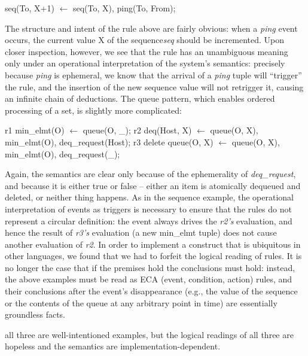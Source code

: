 \begin{Dedalus}
seq(To, X+1) \(\leftarrow\) 
  seq(To, X), ping(To, From);
\end{Dedalus}

The structure and intent of the rule above are fairly obvious: when a \emph{ping} event
occurs, the current value X of the sequence\emph{seq} should be incremented.  Upon
closer inspection, however, we see that the rule has an unambiguous meaning only under
an operational interpretation of the system's semantics: precisely because \emph{ping}
is ephemeral, we know that the arrival of a \emph{ping} tuple will ``trigger'' the rule, and 
the insertion of the new sequence value will not retrigger it, causing an infinite chain of
deductions.  The queue pattern, which enables ordered processing of a set, is slightly 
more complicated:

\begin{Dedalus}
r1
min\_elmt(O) \(\leftarrow\)
  queue(O, _);
r2
deq(Host, X) \(\leftarrow\) 
  queue(O, X), min\_elmt(O), 
  deq\_request(Host);
r3
delete queue(O, X) \(\leftarrow\) 
  queue(O, X), min\_elmt(O), 
  deq\_request(\_);
\end{Dedalus}

Again, the semantics are clear only because of the ephemerality of \emph{deq\_request}, and because it is either true or false -- either an item is atomically dequeued and deleted, or neither thing happens.  As in the sequence example, the operational interpretation of events as
triggers is necessary to ensure that the rules do not represent a circular definition: the event 
always drives the \emph{r2's} evaluation, and hence the result of \emph{r3's} evaluation 
(a new min\_elmt tuple) does not cause another evaluation of \emph{r2}.  In order to 
implement a construct that is ubiquitous in other languages, we found that we had to 
forfeit the logical reading of rules.  It is no longer 
the case that if the premises hold the conclusions must hold: instead, the above examples
must be read as ECA (event, condition, action) rules, and their conclusions after the event's 
disappearance (e.g., the value of the sequence or the contents of the queue at any arbitrary 
point in time) are essentially groundless facts.


all three are well-intentioned examples, but the logical readings of all three are hopeless and the semantics are implementation-dependent.


